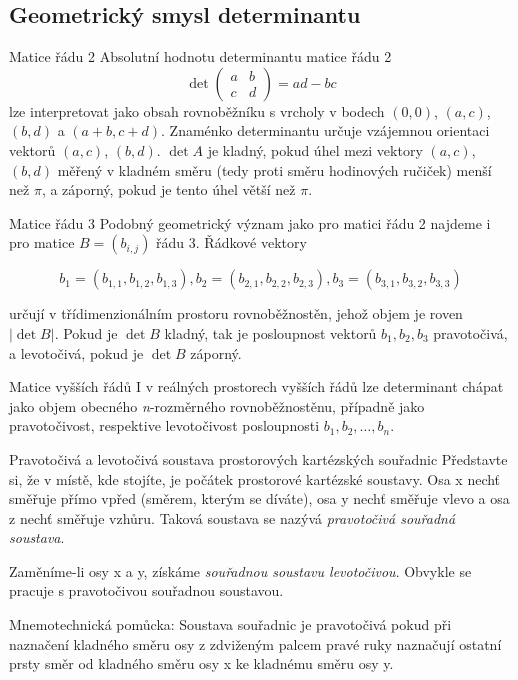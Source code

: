 \subsection{Geometrický smysl determinantu}

\begin{obecne}{Matice řádu 2}
Absolutní hodnotu determinantu matice řádu 2
$$\det\left(
\begin{array}{cc}
a & b\\
c & d
\end{array}
\right) = ad - bc
$$
lze interpretovat jako obsah rovnoběžníku s vrcholy v bodech $(0,0)$, $(a,c)$, $(b, d)$ a $(a+b, c+d)$. Znaménko determinantu určuje vzájemnou orientaci vektorů $(a,c)$, $(b, d)$. $\det A$ je kladný, pokud úhel mezi vektory $(a,c)$, $(b, d)$ měřený v kladném směru (tedy proti směru hodinových ručiček) menší než $\pi$, a záporný, pokud je tento úhel větší než $\pi$.
\end{obecne}

\begin{obecne}{Matice řádu 3}
Podobný geometrický význam jako pro matici řádu 2 najdeme i pro matice $B = (b_{i,j})$ řádu 3. Řádkové vektory

$$b_1 = (b_{1,1}, b_{1,2}, b_{1,3}), b_2 = (b_{2,1}, b_{2,2}, b_{2,3}), b_3 = (b_{3,1}, b_{3,2}, b_{3,3})$$

určují v třídimenzionálním prostoru rovnoběžnostěn, jehož objem je roven $\left| \det B \right|$. Pokud je $\det B$ kladný, tak je posloupnost vektorů $b_1, b_2, b_3$ pravotočivá, a levotočivá, pokud je $\det B$ záporný.
\end{obecne}

\begin{obecne}{Matice vyšších řádů}
I v reálných prostorech vyšších řádů lze determinant chápat jako objem obecného \emph{n}-rozměrného rovnoběžnostěnu, případně jako pravotočivost, respektive levotočivost posloupnosti $b_1, b_2,  \dots , b_n$.
\end{obecne}

\begin{definiceN}{Pravotočivá a levotočivá soustava prostorových kartézských souřadnic}
Představte si, že v místě, kde stojíte, je počátek prostorové kartézské soustavy. Osa x nechť směřuje přímo vpřed (směrem, kterým se díváte), osa y nechť směřuje vlevo a osa z nechť směřuje vzhůru. Taková soustava se nazývá \emph{pravotočivá souřadná soustava}.

Zaměníme-li osy x a y, získáme \emph{souřadnou soustavu levotočivou}. Obvykle se pracuje s pravotočivou souřadnou soustavou.

Mnemotechnická pomůcka: Soustava souřadnic je pravotočivá pokud při naznačení kladného směru osy z zdviženým palcem pravé ruky naznačují ostatní prsty směr od kladného směru osy x ke kladnému směru osy y.
\end{definiceN}


